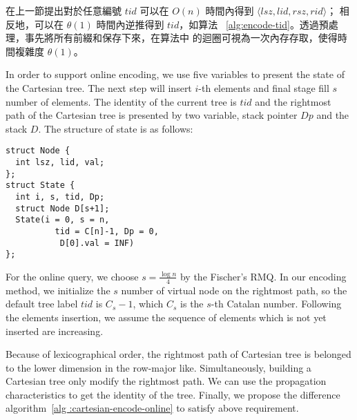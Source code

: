 在上一節提出對於任意編號 $\mathit{tid}$ 可以在 $O(n)$ 時間內得到
$\langle\mathit{lsz},\mathit{lid},\mathit{rsz},\mathit{rid}\rangle$；
相反地，可以在 $\theta(1)$ 時間內逆推得到 $\mathit{tid}$，如算法
~\ref{alg:encode-tid}。透過預處理，事先將所有前綴和保存下來，在算法中
的迴圈可視為一次內存存取，使得時間複雜度 $\theta(1)$。\fi




\iffalse
根據先前的字典順序編碼，只需要維護笛卡爾樹的右鏈，實作上與堆疊結構相同。
基於 row-major 順序和遞迴定義 ~\ref{fun:LCA}，修改之前論文對於的離線編碼，
其對應方案如算法 \ref{alg:cartesian-encode-offline}。
\fi



In order to support online encoding, we use five variables to present
the state of the Cartesian tree.  The next step will insert $i$-th
elements and final stage fill $s$ number of elements.  The identity of
the current tree is $\mathit{tid}$ and the rightmost path of the
Cartesian tree is presented by two variable, stack pointer
$\mathit{Dp}$ and the stack $\mathit{D}$. The structure of state is as
follows:

\iffalse
我們定義轉移狀態由 5 個變數來決定動態笛卡爾樹的編碼，當前插入第 $i$ 個
元素，最終填充 $s$ 個元素，當前的樹編號 $\mathit{tid}$，以及笛卡爾樹的
右鏈狀態指針 $Dp$ 與其堆疊 $D$，其結構如下：
\fi

\begin{minipage}{0.9\linewidth}
\begin{lstlisting}[frame=single,caption=State of Cartesian Tree]
struct Node {
  int lsz, lid, val;
};
struct State {
  int i, s, tid, Dp;
  struct Node D[s+1];
  State(i = 0, s = n, 
          tid = C[n]-1, Dp = 0,
           D[0].val = INF)
};
\end{lstlisting}
\end{minipage}

For the online query, we choose $s=\frac{\log n}{4}$ by the Fischer's
RMQ.  In our encoding method, we initialize the $s$ number of virtual
node on the rightmost path, so the default tree label $\mathit{tid}$
is $C_s - 1$, which $C_s$ is the $s$-th Catalan number.  Following the
elements insertion, we assume the sequence of elements which is not
yet inserted are increasing.

Because of lexicographical order, the rightmost path of Cartesian tree
is belonged to the lower dimension in the row-major like.
Simultaneously, building a Cartesian tree only modify the rightmost
path. We can use the propagation characteristics to get the identity of
the tree.  Finally, we propose the difference algorithm~\ref{alg
:cartesian-encode-online} to satisfy above requirement.

